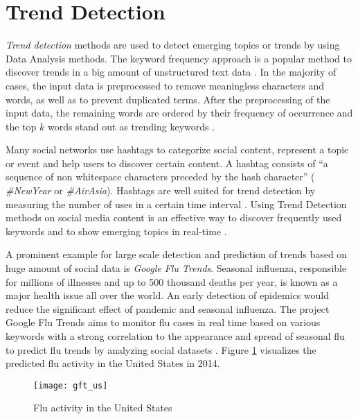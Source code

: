 \section{Trend Detection}
\label{sec:trends}
\textit{Trend detection} methods are used to detect emerging topics or trends by using Data Analysis methods. The keyword frequency approach is a popular method to discover trends in a big amount of unstructured text data \cite{journals/smarthome/Kim+13}. In the majority of cases, the input data is preprocessed to remove meaningless characters and words, as well as to prevent duplicated terms. After the preprocessing of the input data, the remaining words are ordered by their frequency of occurrence and the top $k$ words stand out as trending keywords \cite[213\psq]{journals/smarthome/Kim+13}.

Many social networks use hashtags to categorize social content, represent a topic or event and help users to discover certain content. A hashtag consists of \enquote{a sequence of non whitespace characters preceded by the hash character} \cites[644]{conf/wsdm/TsurR12}[1427]{conf/wsdm/TsurR12,conf/asunam/ZhangWL13} (\eg{} \textit{\#NewYear} or \textit{\#AirAsia}). Hashtags are well suited for trend detection by measuring the number of uses in a certain time interval \cite[1427]{conf/asunam/ZhangWL13}. Using Trend Detection methods on social media content is an effective way to discover frequently used keywords and to show emerging topics in real-time \cite{journals/smarthome/Kim+13,TwitterDataAnalytics2013}.

A prominent example for large scale detection and prediction of trends based on huge amount of social data is \textit{Google Flu Trends}. Seasonal influenza, responsible for millions of illnesses and up to 500 thousand deaths per year, is known as a major health issue all over the world. An early detection of epidemics would reduce the significant effect of pandemic and seasonal influenza. The project Google Flu Trends aims to monitor flu cases in real time based on various keywords with a strong correlation to the appearance and spread of seasonal flu to predict flu trends by analyzing social datasets \cites{Google09detection}[1]{Weber2014,Tech22014}. Figure \ref{fig:use_case_gft} visualizes the predicted flu activity in the United States in 2014.

\begin{figure}[H]
  \centering
        \texttt{[image: gft\_us]}
  \caption[Flu activity in the United States]{Flu activity in the United States \cite{gft2014}}
  \label{fig:use_case_gft}
  \vspace{-1.3em}
\end{figure}